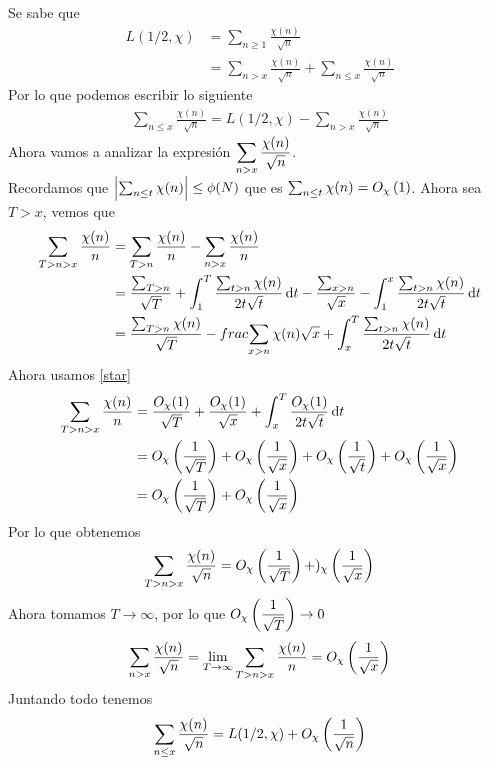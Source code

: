 \begin{sol}
	Se sabe que
	\begin{align*}
		L(1/2,\chi) & =\sum_{n\geq1}\frac{\chi(n)}{\sqrt{n}}                                     \\
		            & =\sum_{n>x}\frac{\chi(n)}{\sqrt{n}}+\sum_{n\leq x}\frac{\chi(n)}{\sqrt{n}}
	\end{align*}
	Por lo que podemos escribir lo siguiente
	\begin{align*}
		\sum_{n\leq x}\frac{\chi(n)}{\sqrt{n}}=L(1/2,\chi)-\sum_{n>x}\frac{\chi(n)}{\sqrt{n}}
	\end{align*}
	Ahora vamos a analizar la expresión $\displaystyle\sum_{n>x}\frac{\chi(n)}{\sqrt{n}}$.\\
	Recordamos que $\left|\sum_{n\leq t}\chi(n)\right|\leq\phi(N)$ que es $\sum_{n\leq t}\chi(n)=O_\chi\left(1\right)\label{star}$. Ahora sea $T>x$, vemos que
	\begin{align*}
		\sum_{T>n>x}\frac{\chi(n)}{n} & =\sum_{T>n}\frac{\chi(n)}{n}-\sum_{n>x}\frac{\chi(n)}{n}                                                                                                     \\
		                              & =\frac{\sum_{T>n}}{\sqrt{T}}+\int_1^T\frac{\sum_{t>n}\chi(n)}{2t\sqrt{t}}\operatorname{d}\!{t}-\frac{\sum_{x>n}}{\sqrt{x}}-\int_1^x\frac{\sum_{t>n}\chi(n)}{2t\sqrt{t}}\operatorname{d}\!{t} \\
		                              & =\frac{\sum_{T>n}\chi(n)}{\sqrt{T}}-frac{\sum_{x>n}\chi(n)}{\sqrt{x}}+\int_x^T\frac{\sum_{t>n}\chi(n)}{2t\sqrt{t}}\operatorname{d}\!{t}
	\end{align*}
	Ahora usamos \eqref{star}
	\begin{align*}
		\sum_{T>n>x}\frac{\chi(n)}{n} & = \frac{O_\chi(1)}{\sqrt{T}}+\frac{O_\chi(1)}{\sqrt{x}}+\int_x^T\frac{O_\chi(1)}{2t\sqrt{t}}\operatorname{d}\!{t}                            \\
		                              & =O_\chi\left(\frac1{\sqrt{T}}\right)+O_\chi\left(\frac1{\sqrt{x}}\right)+O_\chi\left(\frac1{\sqrt{t}}\right)+O_\chi\left(\frac1{\sqrt{x}}\right) \\
		                              & =O_\chi\left(\frac1{\sqrt{T}}\right)+O_\chi\left(\frac1{\sqrt{x}}\right)
	\end{align*}
	Por lo que obtenemos
	\begin{equation*}
		\sum_{T>n>x}\frac{\chi(n)}{\sqrt{n}}=O_\chi\left(\frac1{\sqrt{T}}\right)+)_\chi\left(\frac1{\sqrt{x}}\right)
	\end{equation*}
	Ahora tomamos $T\rightarrow\infty$, por lo que $O_\chi\left(\dfrac1{\sqrt{T}}\right)\rightarrow0$
	\begin{equation*}
		\sum_{n>x}\frac{\chi(n)}{\sqrt{n}}=\lim_{T\rightarrow\infty}\sum_{T>n>x}\frac{\chi(n)}{n}=O_\chi\left(\frac1{\sqrt{x}}\right)
	\end{equation*}
	Juntando todo tenemos
	\begin{equation*}
		\sum_{n\leq x}\frac{\chi(n)}{\sqrt{n}}=L(1/2,\chi)+O_\chi\left(\frac1{\sqrt{n}}\right)
	\end{equation*}
\end{sol}

